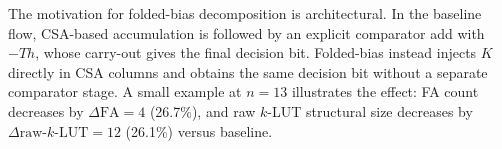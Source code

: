 The motivation for folded-bias decomposition is architectural.
In the baseline flow, CSA-based accumulation is followed by an explicit comparator add with $-Th$, whose carry-out
gives the final decision bit.
Folded-bias instead injects $K$ directly in CSA columns and obtains the same decision bit without a separate
comparator stage.
A small example at $n=13$ illustrates the effect: FA count decreases by $\Delta\mathrm{FA}=4$ (26.7\%),
and raw $k$-LUT structural size decreases by $\Delta\mathrm{raw\text{-}}k\mathrm{\text{-}LUT}=12$ (26.1\%) versus baseline.
